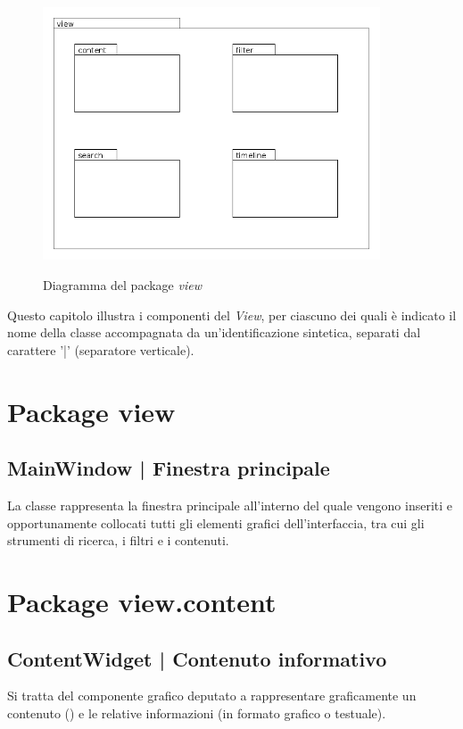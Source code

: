\documentclass[10pt,a4paper,headinclude,footinclude,hidelinks]{scrreprt} %
\begin{document}
	\begin{figure}[ht]
		\begin{center}
	    	\includegraphics[width=10cm]{package/view.png}
			\label{gfx:package:view}
			\caption{Diagramma del package \textit{view}}
		\end{center}
	\end{figure}

	Questo capitolo illustra i componenti del \textit{View}, per ciascuno dei quali è indicato il nome della classe accompagnata da un'identificazione sintetica, separati dal carattere '|' (separatore verticale).

	\section{Package view}
	\label{sec:stage:design:sistema:view}
	
	\subsection[MainWindow]{MainWindow | Finestra principale}
	\label{sec:stage:design:sistema:view:window}
	La classe \textit{} rappresenta la finestra principale all'interno del quale vengono inseriti e opportunamente collocati tutti gli elementi grafici dell'interfaccia, tra cui gli strumenti di ricerca, i filtri e i contenuti.

	\section{Package view.content}
	\label{sec:stage:design:sistema:view.content}

	\subsection[ContentWidget]{ContentWidget | Contenuto informativo}
	\label{sec:stage:design:sistema:view:content-widget}
	Si tratta del componente grafico deputato a rappresentare graficamente un contenuto (\textit{}) e le relative informazioni (in formato grafico o testuale).
\end{document}
